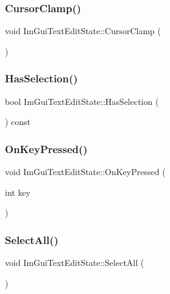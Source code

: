 \subsubsection{\texorpdfstring{Cursor\+Clamp()}{CursorClamp()}}
{\footnotesize\ttfamily void Im\+Gui\+Text\+Edit\+State\+::\+Cursor\+Clamp (\begin{DoxyParamCaption}{ }\end{DoxyParamCaption})}

\hypertarget{struct_im_gui_text_edit_state_a46735493114451380c2d3684b528d124}{}\label{struct_im_gui_text_edit_state_a46735493114451380c2d3684b528d124} 
\subsubsection{\texorpdfstring{Has\+Selection()}{HasSelection()}}
{\footnotesize\ttfamily bool Im\+Gui\+Text\+Edit\+State\+::\+Has\+Selection (\begin{DoxyParamCaption}{ }\end{DoxyParamCaption}) const}

\hypertarget{struct_im_gui_text_edit_state_a30a1d78690ef2bbb9d4b8f75385b8c26}{}\label{struct_im_gui_text_edit_state_a30a1d78690ef2bbb9d4b8f75385b8c26} 
\subsubsection{\texorpdfstring{On\+Key\+Pressed()}{OnKeyPressed()}}
{\footnotesize\ttfamily void Im\+Gui\+Text\+Edit\+State\+::\+On\+Key\+Pressed (\begin{DoxyParamCaption}\item[{int}]{key }\end{DoxyParamCaption})}

\hypertarget{struct_im_gui_text_edit_state_ab6f494f3335bf7911b83cfc15edd612e}{}\label{struct_im_gui_text_edit_state_ab6f494f3335bf7911b83cfc15edd612e} 
\subsubsection{\texorpdfstring{Select\+All()}{SelectAll()}}
{\footnotesize\ttfamily void Im\+Gui\+Text\+Edit\+State\+::\+Select\+All (\begin{DoxyParamCaption}{ }\end{DoxyParamCaption})}



